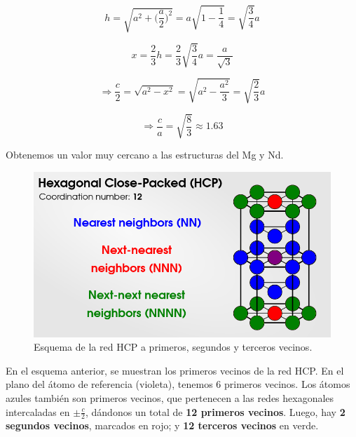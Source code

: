 \documentclass[a4paper]{article}
\begin{document}
$$h = \sqrt{a^{2} + \bigg(\frac{a}{2}\bigg)^{2}} = a\sqrt{1 - \frac{1}{4}} = \sqrt{\frac{3}{4}}a$$

$$x = \frac{2}{3}h = \frac{2}{3}\sqrt{\frac{3}{4}}a = \frac{a}{\sqrt{3}}$$

$$\Rightarrow \frac{c}{2} = \sqrt{a^{2} - x^{2}} = \sqrt{a^{2} - \frac{a^{2}}{3}} = \sqrt{\frac{2}{3}}a$$

$$\Rightarrow \frac{c}{a} = \sqrt{\frac{8}{3}} \approx 1.63$$

Obtenemos un valor muy cercano a las estructuras del Mg y Nd.\\

\begin{figure}[H]
  \centering
  \includegraphics[width=0.5\linewidth,height=0.3\linewidth]{red3d_hcp_n.png}
  \caption{Esquema de la red HCP a primeros, segundos y terceros vecinos.}
  \label{fig:red3d_hcp_n}
\end{figure}

En el esquema anterior, se muestran los primeros vecinos de la red HCP. En el plano del \'atomo de referencia (violeta), tenemos 6 primeros vecinos. Los \'atomos azules tambi\'en son primeros vecinos, que pertenecen a las redes hexagonales intercaladas en $\pm \frac{c}{2}$, d\'andonos un total de \textbf{12 primeros vecinos}. Luego, hay \textbf{2 segundos vecinos}, marcados en rojo; y \textbf{12 terceros vecinos} en verde.

\subsection{}
\end{document}
